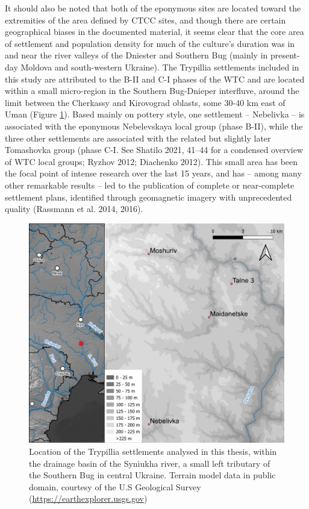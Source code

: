 \documentclass[
  12pt,
  a4paper, twoside]{book}
\begin{document}
It should also be noted that both of the eponymous sites are located toward the extremities of the area defined by CTCC sites, and though there are certain geographical biases in the documented material, it seems clear that the core area of settlement and population density for much of the culture's duration was in and near the river valleys of the Dniester and Southern Bug (mainly in present-day Moldova and south-western Ukraine). The Trypillia settlements included in this study are attributed to the B-II and C-I phases of the WTC and are located within a small micro-region in the Southern Bug-Dnieper interfluve, around the limit between the Cherkassy and Kirovograd oblasts, some 30-40 km east of Uman (Figure \ref{fig:03-trypillia}). Based mainly on pottery style, one settlement -- Nebelivka -- is associated with the eponymous Nebelevskaya local group (phase B-II), while the three other settlements are associated with the related but slightly later Tomashovka group (phase C-I. See Shatilo 2021, 41--44 for a condensed overview of WTC local groups; Ryzhov 2012; Diachenko 2012). This small area has been the focal point of intense research over the last 15 years, and has -- among many other remarkable results -- led to the publication of complete or near-complete settlement plans, identified through geomagnetic imagery with unprecedented quality (Rassmann et al. 2014, 2016).



\begin{figure}

{\centering \includegraphics[width=0.9\linewidth]{Results/fig03_trypillia} 

}

\caption[Map with location of Trypillia sites]{Location of the Trypillia settlements analysed in this thesis, within the drainage basin of the Syniukha river, a small left tributary of the Southern Bug in central Ukraine. Terrain model data in public domain, courtesy of the U.S Geological Survey (\url{https://earthexplorer.usgs.gov})}\label{fig:03-trypillia}
\end{figure}
\end{document}
